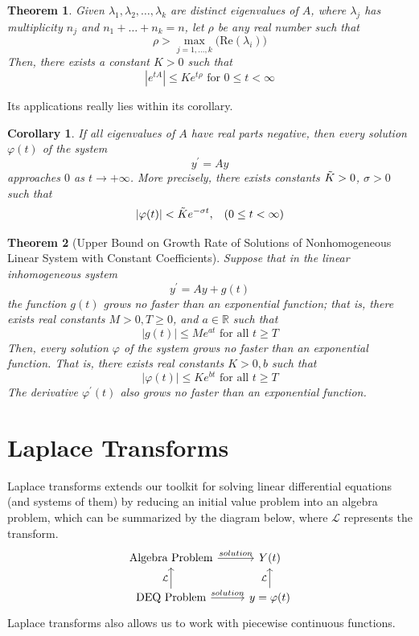 \documentclass{article}
\newtheorem{theorem}{Theorem}[section]
\newtheorem{corollary}{Corollary}[theorem]
\theoremstyle{remark}
\theoremstyle{definition}
\begin{document}
      \begin{theorem}
      Given $\lambda_1, \lambda_2, \ldots, \lambda_k$ are distinct eigenvalues of $A$, where $\lambda_j$ has multiplicity $n_j$ and $n_1 + \ldots + n_k = n$, let $\rho$ be any real number such that 
      \[\rho > \max_{j=1, \ldots, k} \big( \text{Re}(\lambda_i)\big)\]
      Then, there exists a constant $K > 0$ such that
      \[|e^{tA}| \leq K e^{t \rho} \text{ for } 0 \leq t < \infty\]
      \end{theorem}

      Its applications really lies within its corollary. 

      \begin{corollary}
      If all eigenvalues of $A$ have real parts negative, then every solution $\varphi(t)$ of the system
      \[y^\prime = A y\]
      approaches $0$ as $t \rightarrow + \infty$. More precisely, there exists constants $\Tilde{K} > 0$, $\sigma > 0$ such that
      \[|\varphi(t)|< \Tilde{K} e^{-\sigma t}, \;\;\; (0 \leq t < \infty)\]
      \end{corollary}

      \begin{theorem}[Upper Bound on Growth Rate of Solutions of Nonhomogeneous Linear System with Constant Coefficients]
      Suppose that in the linear inhomogeneous system 
      \[y^\prime = A y + g(t)\]
      the function $g(t)$ grows no faster than an exponential function; that is, there exists real constants $M > 0, T \geq 0$, and $a \in \mathbb{R}$ such that
      \[|g(t)| \leq M e^{at} \text{ for all } t \geq T\]
      Then, every solution $\varphi$ of the system grows no faster than an exponential function. That is, there exists real constants $K>0, b$ such that
      \[|\varphi(t)| \leq K e^{bt} \text{ for all } t \geq T\]
      The derivative $\varphi^\prime (t)$ also grows no faster than an exponential function. 
      \end{theorem}

\section{Laplace Transforms}

  Laplace transforms extends our toolkit for solving linear differential equations (and systems of them) by reducing an initial value problem into an algebra problem, which can be summarized by the diagram below, where $\mathcal{L}$ represents the transform. 
  \[
    \begin{tikzcd}
      \text{Algebra Problem} \arrow{r}{solution} &  Y(t)\\
      \text{DEQ Problem} \arrow{u}{\mathcal{L}} \arrow{r}{solution} & y = \varphi(t) \arrow{u}{\mathcal{L}}
    \end{tikzcd}
  \]
  Laplace transforms also allows us to work with piecewise continuous functions. 
\end{document}
